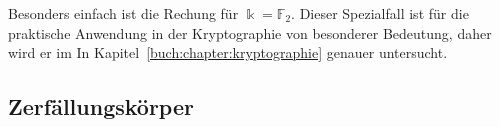 Besonders einfach ist die Rechung für $\Bbbk=\mathbb{F}_2$.
Dieser Spezialfall ist für die praktische Anwendung in der Kryptographie
von besonderer Bedeutung, daher wird er im 
In Kapitel~\ref{buch:chapter:kryptographie} genauer untersucht.

\subsection{Zerfällungskörper
\label{buch:subsection:zerfaellungskoerper}}





